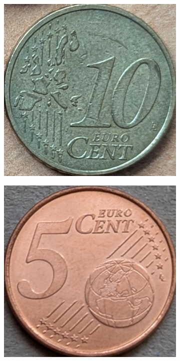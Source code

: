 \begin{figure}[ht]
    \begin{subfigure}{0.23\textwidth}
        \includegraphics[width=\linewidth]{../CoinFinder/templates_2/Cent10.png}
    \end{subfigure}
    \begin{subfigure}{0.23\textwidth}
        \includegraphics[width=\linewidth]{../CoinFinder/templates_2/Cent5.png}

\end{subfigure}
\end{figure}
